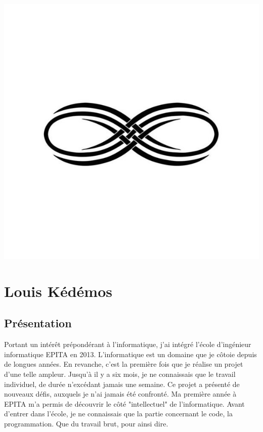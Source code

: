 \documentclass[12pt]{article}
\begin{document}
\begin{center}
\includegraphics[scale=00.20]{infini}
\end{center}


\setlength{\headheight}{13pt} %
\setlength{\headsep}{2.5cm} %
\setlength{\footskip}{2.5cm}





\newpage
\thispagestyle{empty}
\pagestyle{fancyplain} \chead{} 
\tableofcontents

\newpage
\setcounter{page}{1} 
\section{Louis Kédémos}

\subsection{Présentation}

Portant un intérêt prépondérant à l'informatique, j'ai intégré l'école d'ingénieur informatique EPITA en 2013. L'informatique est un domaine que je côtoie depuis de longues années. En revanche, c'est la première fois que je réalise un projet d'une telle ampleur. Jusqu'à il y a six mois, je ne connaissais que le travail individuel, de durée n'excédant jamais une semaine. Ce projet a présenté de nouveaux défis, auxquels je n'ai jamais été confronté. Ma première année à EPITA m'a permis de découvrir le côté "intellectuel" de l'informatique. Avant d'entrer dans l'école, je ne connaissais que la partie concernant le code, la programmation. Que du travail brut, pour ainsi dire. 
\end{document}
